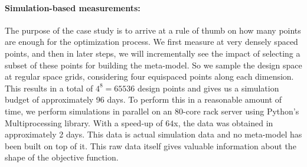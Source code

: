 \paragraph{Simulation-based measurements:} The purpose of the case study is to arrive at a rule of thumb on how many points are enough for the optimization process. We first measure at very densely spaced points, and then in later steps, we will incrementally see the impact of selecting a subset of these points for building the meta-model. So we sample the design space at regular space grids, considering four equispaced points along each dimension. This results in a total of $4^8 = 65536$ design points and gives us a simulation budget of approximately 96 days. To perform this in a reasonable amount of time, we perform simulations in parallel on an 80-core rack server using Python's Multiprocessing \cite{Multiprocessing} library. With a speed-up of $64$x, the data was obtained in approximately 2 days. This data is actual simulation data and no meta-model has been built on top of it. This raw data itself gives valuable information about the shape of the objective function.
